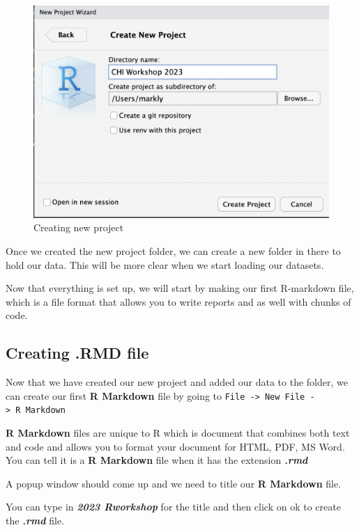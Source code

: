 \documentclass[
]{book}
\begin{document}
\begin{figure}
\includegraphics[width=16.33in]{images/2.13newproject3} \caption{Creating new project}\label{fig:unnamed-chunk-5-3}
\end{figure}

Once we created the new project folder, we can create a new folder in there to hold our data. This will be more clear when we start loading our datasets.

Now that everything is set up, we will start by making our first R-markdown file, which is a file format that allows you to write reports and as well with chunks of code.

\hypertarget{creating-.rmd-file}{%
\subsection{Creating .RMD file}\label{creating-.rmd-file}}

Now that we have created our new project and added our data to the folder, we can create our first \textbf{R Markdown} file by going to \texttt{File\ -\textgreater{}\ New\ File\ -\textgreater{}\ R\ Markdown}

\textbf{R Markdown} files are unique to R which is document that combines both text and code and allows you to format your document for HTML, PDF, MS Word. You can tell it is a \textbf{R Markdown} file when it has the extension \textbf{\emph{.rmd}}

A popup window should come up and we need to title our \textbf{R Markdown} file.

You can type in \textbf{\emph{2023 Rworkshop}} for the title and then click on ok to create the \textbf{\emph{.rmd}} file.
\end{document}
